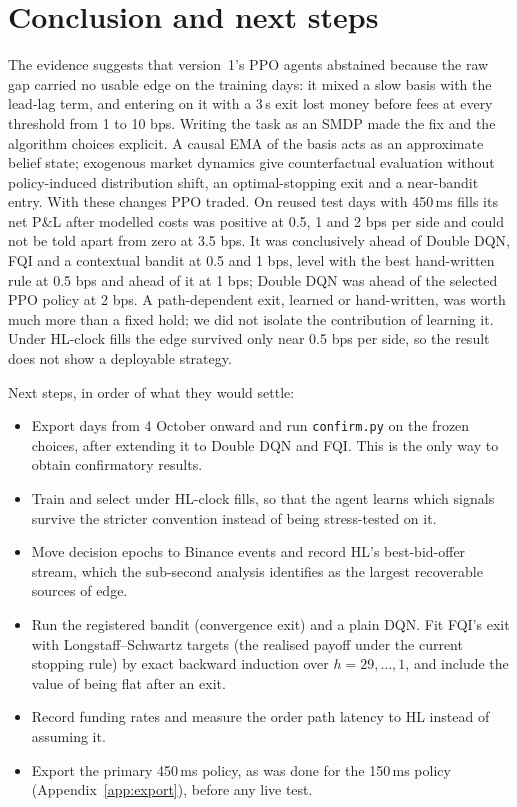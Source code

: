 \documentclass[12pt,a4paper]{article}
\DeclareRobustCommand{\bps}{\ifmmode\,\text{bps}\else\,bps\fi}
\begin{document}
\section{Conclusion and next steps}\label{sec:conclusion}
The evidence suggests that version~1's PPO agents abstained because the raw gap carried no
usable edge on the training days: it mixed a slow basis with the lead-lag term, and entering on
it with a 3\,s exit lost money before fees at every threshold from 1 to 10\bps. Writing the
task as an SMDP made the fix and the algorithm choices explicit. A causal EMA of the basis acts
as an approximate belief state; exogenous market dynamics give counterfactual evaluation
without policy-induced distribution shift, an optimal-stopping exit and a near-bandit entry.
With these changes PPO traded. On reused test days with 450\,ms fills its net P\&L after
modelled costs was positive at 0.5, 1 and 2\bps{} per side and could not be told apart from
zero at 3.5\bps. It was conclusively ahead of Double DQN, FQI and a contextual bandit at 0.5
and 1\bps, level with the best hand-written rule at 0.5\bps{} and ahead of it at 1\bps; Double
DQN was ahead of the selected PPO policy at 2\bps. A path-dependent exit, learned or
hand-written, was worth much more than a fixed hold; we did not isolate the contribution of
learning it. Under HL-clock fills the edge survived only near 0.5\bps{} per side, so the result
does not show a deployable strategy.

Next steps, in order of what they would settle:
\begin{itemize}
\item Export days from 4 October onward and run \texttt{confirm.py} on the frozen choices,
after extending it to Double DQN and FQI. This is the only way to obtain confirmatory
results.
\item Train and select under HL-clock fills, so that the agent learns which signals survive the
stricter convention instead of being stress-tested on it.
\item Move decision epochs to Binance events and record HL's best-bid-offer stream, which the
sub-second analysis identifies as the largest recoverable sources of edge.
\item Run the registered bandit (convergence exit) and a plain DQN. Fit FQI's exit with
Longstaff--Schwartz targets (the realised payoff under the current stopping rule) by exact
backward induction over $h=29,\ldots,1$, and include the value of being flat after an exit.
\item Record funding rates and measure the order path latency to HL instead of assuming it.
\item Export the primary 450\,ms policy, as was done for the 150\,ms policy
(Appendix~\ref{app:export}), before any live test.
\end{itemize}
\end{document}
